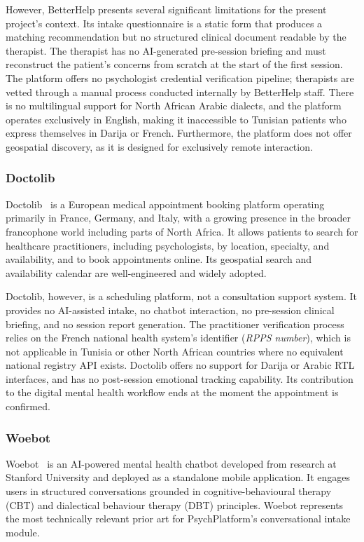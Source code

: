 \documentclass[a4paper,12pt]{report}
\begin{document}
However, BetterHelp presents several significant limitations for the present project's
context. Its intake questionnaire is a static form that produces a matching recommendation
but no structured clinical document readable by the therapist. The therapist has no
AI-generated pre-session briefing and must reconstruct the patient's concerns from
scratch at the start of the first session. The platform offers no psychologist credential
verification pipeline; therapists are vetted through a manual process conducted
internally by BetterHelp staff. There is no multilingual support for North African
Arabic dialects, and the platform operates exclusively in English, making it inaccessible
to Tunisian patients who express themselves in Darija or French. Furthermore, the
platform does not offer geospatial discovery, as it is designed for exclusively remote
interaction.
 
\subsubsection{Doctolib}
 
Doctolib~\cite{Doctolib2023} is a European medical appointment booking platform
operating primarily in France, Germany, and Italy, with a growing presence in the
broader francophone world including parts of North Africa. It allows patients to search
for healthcare practitioners, including psychologists, by location, specialty, and
availability, and to book appointments online. Its geospatial search and availability
calendar are well-engineered and widely adopted.
 
Doctolib, however, is a scheduling platform, not a consultation support system. It
provides no AI-assisted intake, no chatbot interaction, no pre-session clinical
briefing, and no session report generation. The practitioner verification process
relies on the French national health system's identifier (\emph{RPPS number}), which
is not applicable in Tunisia or other North African countries where no equivalent
national registry API exists. Doctolib offers no support for Darija or Arabic RTL
interfaces, and has no post-session emotional tracking capability. Its contribution
to the digital mental health workflow ends at the moment the appointment is confirmed.
 
\subsubsection{Woebot}
 
Woebot~\cite{Woebot2023} is an AI-powered mental health chatbot developed from research
at Stanford University and deployed as a standalone mobile application. It engages
users in structured conversations grounded in cognitive-behavioural therapy (CBT) and
dialectical behaviour therapy (DBT) principles. Woebot represents the most technically
relevant prior art for PsychPlatform's conversational intake module.
 
\end{document}
